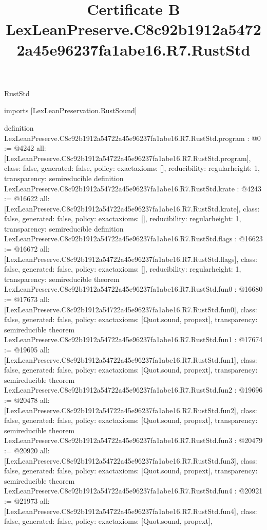 \begin{lexlean}{RustStd}
\title{Certificate B LexLeanPreserve.C8c92b1912a54722a45e96237fa1abe16.R7.RustStd}
\begin{coremodule}
imports [LexLeanPreservation.RustSound]

definition LexLeanPreserve.C8c92b1912a54722a45e96237fa1abe16.R7.RustStd.program : @0 := @4242 {
  all: [LexLeanPreserve.C8c92b1912a54722a45e96237fa1abe16.R7.RustStd.program],
  class: false,
  generated: false,
  policy: exact{axioms: []},
  reducibility: regular{height: 1},
  transparency: semireducible
}
definition LexLeanPreserve.C8c92b1912a54722a45e96237fa1abe16.R7.RustStd.krate : @4243 := @16622 {
  all: [LexLeanPreserve.C8c92b1912a54722a45e96237fa1abe16.R7.RustStd.krate],
  class: false,
  generated: false,
  policy: exact{axioms: []},
  reducibility: regular{height: 1},
  transparency: semireducible
}
definition LexLeanPreserve.C8c92b1912a54722a45e96237fa1abe16.R7.RustStd.flags : @16623 := @16672 {
  all: [LexLeanPreserve.C8c92b1912a54722a45e96237fa1abe16.R7.RustStd.flags],
  class: false,
  generated: false,
  policy: exact{axioms: []},
  reducibility: regular{height: 1},
  transparency: semireducible
}
theorem LexLeanPreserve.C8c92b1912a54722a45e96237fa1abe16.R7.RustStd.fun0 : @16680 := @17673 {
  all: [LexLeanPreserve.C8c92b1912a54722a45e96237fa1abe16.R7.RustStd.fun0],
  class: false,
  generated: false,
  policy: exact{axioms: [Quot.sound, propext]},
  transparency: semireducible
}
theorem LexLeanPreserve.C8c92b1912a54722a45e96237fa1abe16.R7.RustStd.fun1 : @17674 := @19695 {
  all: [LexLeanPreserve.C8c92b1912a54722a45e96237fa1abe16.R7.RustStd.fun1],
  class: false,
  generated: false,
  policy: exact{axioms: [Quot.sound, propext]},
  transparency: semireducible
}
theorem LexLeanPreserve.C8c92b1912a54722a45e96237fa1abe16.R7.RustStd.fun2 : @19696 := @20478 {
  all: [LexLeanPreserve.C8c92b1912a54722a45e96237fa1abe16.R7.RustStd.fun2],
  class: false,
  generated: false,
  policy: exact{axioms: [Quot.sound, propext]},
  transparency: semireducible
}
theorem LexLeanPreserve.C8c92b1912a54722a45e96237fa1abe16.R7.RustStd.fun3 : @20479 := @20920 {
  all: [LexLeanPreserve.C8c92b1912a54722a45e96237fa1abe16.R7.RustStd.fun3],
  class: false,
  generated: false,
  policy: exact{axioms: [Quot.sound, propext]},
  transparency: semireducible
}
theorem LexLeanPreserve.C8c92b1912a54722a45e96237fa1abe16.R7.RustStd.fun4 : @20921 := @21973 {
  all: [LexLeanPreserve.C8c92b1912a54722a45e96237fa1abe16.R7.RustStd.fun4],
  class: false,
  generated: false,
  policy: exact{axioms: [Quot.sound, propext]},
}
\end{coremodule}
\end{lexlean}
